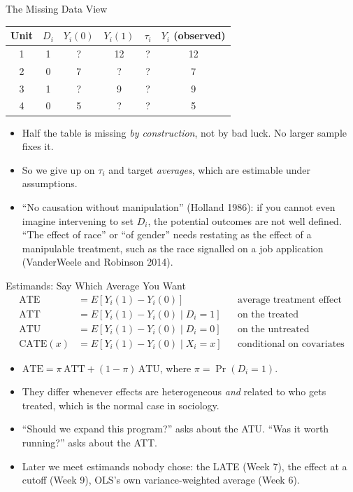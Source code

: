 \documentclass[aspectratio=169,11pt,xcolor=dvipsnames]{beamer}
\newcommand{\srcp}[1]{{\scriptsize\color{gray}(#1)}}
\newcommand{\E}{E}
\newcommand{\core}{\,\raisebox{0.6pt}{\textcolor{corestar}{$\bigstar$}}}
\begin{document}
\begin{frame}{The Missing Data View}
\begin{center}\small
\renewcommand{\arraystretch}{1.2}
\begin{tabular}{cccccc}
\toprule
Unit & $D_i$ & $Y_i(0)$ & $Y_i(1)$ & $\tau_i$ & $Y_i$ (observed) \\
\midrule
1 & 1 & \textcolor{accent}{?} & 12 & \textcolor{accent}{?} & 12 \\
2 & 0 & 7 & \textcolor{accent}{?} & \textcolor{accent}{?} & 7 \\
3 & 1 & \textcolor{accent}{?} & 9  & \textcolor{accent}{?} & 9 \\
4 & 0 & 5 & \textcolor{accent}{?} & \textcolor{accent}{?} & 5 \\
\bottomrule
\end{tabular}
\end{center}
\vskip4pt
\begin{itemize}\itemsep3pt
  \item Half the table is missing \emph{by construction}, not by bad luck. No
        larger sample fixes it.
  \item So we give up on $\tau_i$ and target \emph{averages}, which are
        estimable under assumptions.
  \item ``No causation without manipulation'' \srcp{Holland 1986}: if you
        cannot even imagine intervening to set $D_i$, the potential outcomes
        are not well defined. ``The effect of race'' or ``of gender'' needs
        restating as the effect of a manipulable treatment, such as the race
        signalled on a job application \srcp{VanderWeele and Robinson 2014}.
\end{itemize}
\end{frame}

\begin{frame}{Estimands: Say Which Average You Want\core}
\begin{align*}
  \text{ATE} &= \E[Y_i(1) - Y_i(0)] && \text{average treatment effect} \\
  \text{ATT} &= \E[Y_i(1) - Y_i(0) \mid D_i = 1] && \text{on the treated} \\
  \text{ATU} &= \E[Y_i(1) - Y_i(0) \mid D_i = 0] && \text{on the untreated} \\
  \text{CATE}(x) &= \E[Y_i(1) - Y_i(0) \mid X_i = x] && \text{conditional on covariates}
\end{align*}
\vskip2pt
\begin{itemize}\itemsep3pt
  \item $\text{ATE} = \pi\,\text{ATT} + (1-\pi)\,\text{ATU}$, where
        $\pi = \Pr(D_i=1)$.
  \item They differ whenever effects are heterogeneous \emph{and} related to
        who gets treated, which is the normal case in sociology.
  \item ``Should we expand this program?'' asks about the ATU. ``Was it
        worth running?'' asks about the ATT.
  \item Later we meet estimands nobody chose: the LATE (Week 7), the effect
        at a cutoff (Week 9), OLS's own variance-weighted average (Week 6).
\end{itemize}
\end{frame}
\end{document}
